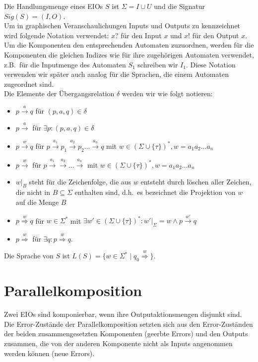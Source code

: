 Die Handlungsmenge eines EIOs $S$ ist $\Sigma = I\cup U$ und die Signatur
$Sig(S)=(I,O)$.\\
Um in graphischen Veranschaulichungen Inputs und Outputs zu kennzeichnet wird
folgende Notation verwendet: $x?$ für den Input $x$ und $x!$ für den Output
$x$.\\
Um die Komponenten den entsprechenden Automaten zuzuordnen, werden für
die Komponenten die gleichen Indizes wie für ihre zugehörigen Automaten
verwendet, z.B.\ für die Inputmenge des Automaten $S_1$ schreiben wir $I_1$.
Diese Notation verwenden wir später auch analog für die Sprachen, die einem
Automaten zugeordnet sind.\\
Die Elemente der Übergangsrelation $\delta$ werden wir wie folgt notieren:
\begin{itemize}
  \item $p\overset{a}{\rightarrow} q$ für $(p,a,q)\in\delta$
  \item $p\overset{a}{\rightarrow}$ für $\exists p: (p,a,q)\in\delta$
  \item $p\overset{w}{\rightarrow} q$ für $p \overset{a_1}{\rightarrow} p_1
    \overset{a_2}{\rightarrow} p_2\dots \overset{a_n}{\rightarrow} q$ mit $w\in
    (\Sigma\cup\{\tau\})^*, w=a_1a_2\dots a_n$
  \item $p\overset{w}{\rightarrow}$ für $p \overset{a_1}{\rightarrow}
    \overset{a_2}{\rightarrow} \dots \overset{a_n}{\rightarrow}$ mit $w\in
    (\Sigma\cup\{\tau\})^*, w=a_1a_2\dots a_n$
  \item $w|_B$ steht für die Zeichenfolge, die aus $w$ entsteht durch löschen
    aller Zeichen, die nicht in $B\subseteq\Sigma$ enthalten sind, d.h.\ es
    bezeichnet die Projektion von $w$ auf die Menge $B$
  \item $p\overset{w}{\Rightarrow} q$ für $w\in\Sigma^*$ mit $\exists
    w'\in(\Sigma\cup\{\tau\})^*:w'|_{\Sigma}=w\wedge p\overset{w'}{\rightarrow}
    q$
  \item $p\overset{w}{\Rightarrow}$ für $\exists q:p\overset{w}{\Rightarrow}
    q$.
\end{itemize}
Die Sprache von $S$ ist
$L(S)=\{w\in\Sigma^*\mid q_0\overset{w}{\Rightarrow}\}$.

\section{Parallelkomposition}
Zwei EIOs sind komponierbar, wenn ihre Outputaktionsmengen disjunkt sind. Die
Error-Zustände der Parallelkomposition setzten sich aus den Error-Zuständen der
beiden zusammengesetzten Komponenten (geerbte Errors) und den Outputs zusammen, die von der
anderen Komponente nicht als Inputs angenommen werden können (neue Errors).


